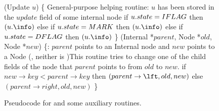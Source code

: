 \begin{figure*}
\begin{code}
		(Update $u$) \{ \tabtabcom General-purpose helping routine\ul
		\n    {}:  $u$ has been stored in the $update$ field of some internal node\nlc
		if $u.state = IF\scriptsize LAG \normalsize$ then $(u.\info)$\label{call-HelpInsert}\nlc
		else if $u.state = M\scriptsize ARK \normalsize$ then $(u.\info)$\label{call-hm2}\nlc
		else if $u.state = DF\scriptsize LAG \normalsize$ then $(u.\info)$\label{call-HelpDelete}\nlc
		\p
		\}\bl
		\nlc
		(Internal *$parent$, Node *$old$, Node *$new$) \{\label{CAS-Child}\ul
		\n  {}:  $parent$ points to an Internal node and $new$ points to a Node (\ie, neither is \NULL)\ul
		\com This routine tries to change one of the child fields of the node that $parent$ points to from $old$ to $new$.\nlc
		if $new \rightarrow key < parent\rightarrow key$ then\label{which-child}\nlc
		\n       \CASB$(parent\rightarrow \lft, old, new)$\label{child-cas-1}\nlc
		\p  else\nlc
		\n       \CASB$(parent\rightarrow right, old, new)$\label{child-cas-2}\nlc
		\p\p 
		\}
	\end{code}
	\caption{\label{code3}Pseudocode for  and some auxiliary routines.}
\end{figure*}
